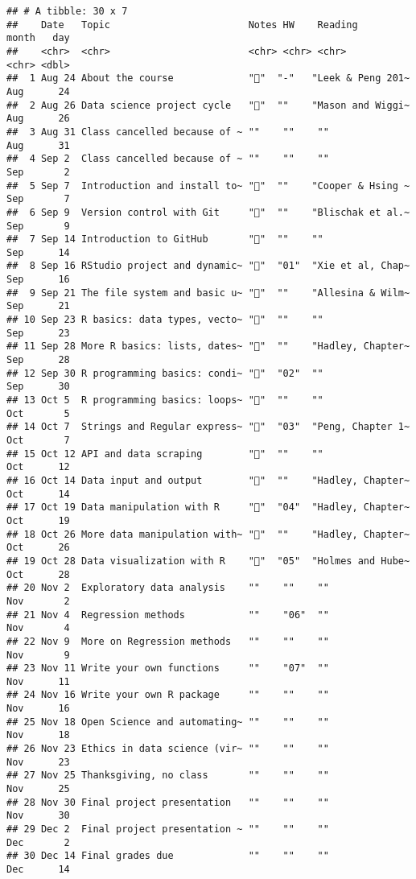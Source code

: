 \documentclass[
]{article}
\begin{document}
\begin{verbatim}
## # A tibble: 30 x 7
##    Date   Topic                        Notes HW    Reading           month   day
##    <chr>  <chr>                        <chr> <chr> <chr>             <chr> <dbl>
##  1 Aug 24 About the course             "📙"  "-"   "Leek & Peng 201~ Aug      24
##  2 Aug 26 Data science project cycle   "📙"  ""    "Mason and Wiggi~ Aug      26
##  3 Aug 31 Class cancelled because of ~ ""    ""    ""                Aug      31
##  4 Sep 2  Class cancelled because of ~ ""    ""    ""                Sep       2
##  5 Sep 7  Introduction and install to~ "📙"  ""    "Cooper & Hsing ~ Sep       7
##  6 Sep 9  Version control with Git     "📙"  ""    "Blischak et al.~ Sep       9
##  7 Sep 14 Introduction to GitHub       "📙"  ""    ""                Sep      14
##  8 Sep 16 RStudio project and dynamic~ "📙"  "01"  "Xie et al, Chap~ Sep      16
##  9 Sep 21 The file system and basic u~ "📙"  ""    "Allesina & Wilm~ Sep      21
## 10 Sep 23 R basics: data types, vecto~ "📙"  ""    ""                Sep      23
## 11 Sep 28 More R basics: lists, dates~ "📙"  ""    "Hadley, Chapter~ Sep      28
## 12 Sep 30 R programming basics: condi~ "📙"  "02"  ""                Sep      30
## 13 Oct 5  R programming basics: loops~ "📙"  ""    ""                Oct       5
## 14 Oct 7  Strings and Regular express~ "📙"  "03"  "Peng, Chapter 1~ Oct       7
## 15 Oct 12 API and data scraping        "📙"  ""    ""                Oct      12
## 16 Oct 14 Data input and output        "📙"  ""    "Hadley, Chapter~ Oct      14
## 17 Oct 19 Data manipulation with R     "📙"  "04"  "Hadley, Chapter~ Oct      19
## 18 Oct 26 More data manipulation with~ "📙"  ""    "Hadley, Chapter~ Oct      26
## 19 Oct 28 Data visualization with R    "📙"  "05"  "Holmes and Hube~ Oct      28
## 20 Nov 2  Exploratory data analysis    ""    ""    ""                Nov       2
## 21 Nov 4  Regression methods           ""    "06"  ""                Nov       4
## 22 Nov 9  More on Regression methods   ""    ""    ""                Nov       9
## 23 Nov 11 Write your own functions     ""    "07"  ""                Nov      11
## 24 Nov 16 Write your own R package     ""    ""    ""                Nov      16
## 25 Nov 18 Open Science and automating~ ""    ""    ""                Nov      18
## 26 Nov 23 Ethics in data science (vir~ ""    ""    ""                Nov      23
## 27 Nov 25 Thanksgiving, no class       ""    ""    ""                Nov      25
## 28 Nov 30 Final project presentation   ""    ""    ""                Nov      30
## 29 Dec 2  Final project presentation ~ ""    ""    ""                Dec       2
## 30 Dec 14 Final grades due             ""    ""    ""                Dec      14
\end{verbatim}
\end{document}
